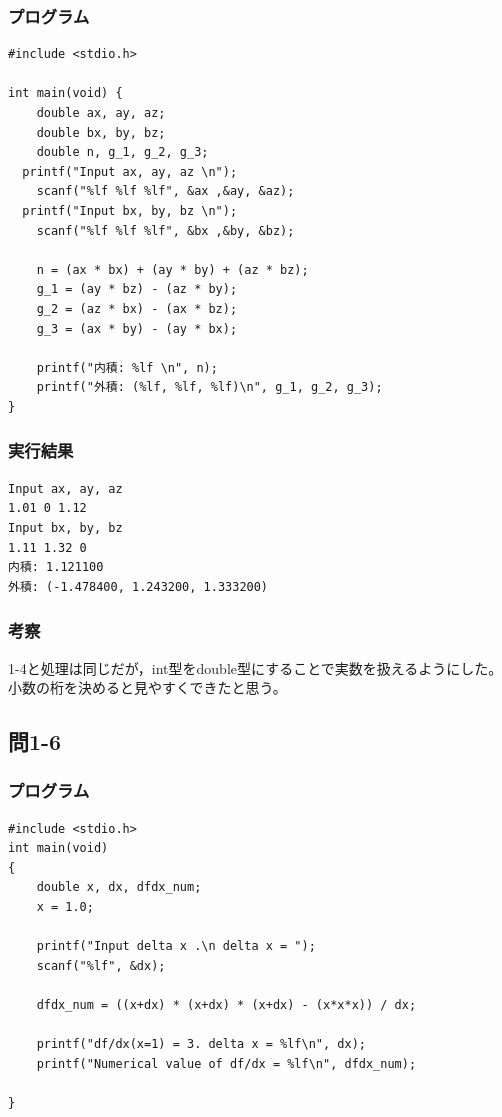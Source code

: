 \documentclass{jarticle}
\begin{document}
\subsubsection{プログラム\\}
\begin{breakbox}
\begin{verbatim}
#include <stdio.h>

int main(void) {
	double ax, ay, az;
	double bx, by, bz;
	double n, g_1, g_2, g_3;
  printf("Input ax, ay, az \n");
	scanf("%lf %lf %lf", &ax ,&ay, &az);
  printf("Input bx, by, bz \n");
	scanf("%lf %lf %lf", &bx ,&by, &bz);
  
	n = (ax * bx) + (ay * by) + (az * bz); 
	g_1 = (ay * bz) - (az * by); 
	g_2 = (az * bx) - (ax * bz); 
	g_3 = (ax * by) - (ay * bx);

	printf("内積: %lf \n", n);
	printf("外積: (%lf, %lf, %lf)\n", g_1, g_2, g_3); 
}
\end{verbatim}
\end{breakbox}
\subsubsection{実行結果\\}
\begin{breakbox}
\begin{verbatim}
Input ax, ay, az 
1.01 0 1.12
Input bx, by, bz 
1.11 1.32 0
内積: 1.121100 
外積: (-1.478400, 1.243200, 1.333200)
\end{verbatim}
\end{breakbox}
\subsubsection{考察\\}
1-4と処理は同じだが，int型をdouble型にすることで実数を扱えるようにした。\\
小数の桁を決めると見やすくできたと思う。\\

\subsection{問1-6\\}
\subsubsection{プログラム\\}
\begin{breakbox}
\begin{verbatim}
#include <stdio.h>
int main(void)
{
    double x, dx, dfdx_num;
    x = 1.0;
    
    printf("Input delta x .\n delta x = ");
    scanf("%lf", &dx);
    
    dfdx_num = ((x+dx) * (x+dx) * (x+dx) - (x*x*x)) / dx;
    
    printf("df/dx(x=1) = 3. delta x = %lf\n", dx);
    printf("Numerical value of df/dx = %lf\n", dfdx_num);

}
\end{verbatim}
\end{breakbox}
\end{document}
